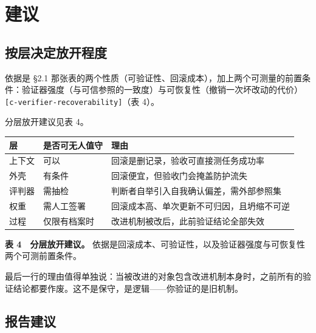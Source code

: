 \section{建议}

\subsection{按层决定放开程度}

依据是 §2.1 那张表的两个性质（可验证性、回滚成本），加上两个可测量的前置条件：验证器强度（与可信参照的一致度）与可恢复性（撤销一次坏改动的代价）{\scriptsize\texttt{[c-\hspace{0pt}verifier-\hspace{0pt}recoverability]}}（表 4）。


分层放开建议见表 4。


\begin{table}[t]
\centering
\footnotesize
\setlength{\tabcolsep}{4pt}
\label{tab:4}
\begin{tabular}{lll}
\toprule
层 & 是否可无人值守 & 理由 \\
\midrule
上下文 & 可以 & 回滚是删记录，验收可直接测任务成功率 \\
外壳 & 有条件 & 回滚便宜，但验收门会掩盖防护流失 \\
评判器 & 需抽检 & 判断者自举引入自我确认偏差，需外部参照集 \\
权重 & 需人工签署 & 回滚成本高、单次更新不可归因，且坍缩不可逆 \\
过程 & 仅限有档案时 & 改进机制被改后，此前验证结论全部失效 \\
\bottomrule
\end{tabular}
\end{table}

\textbf{表 4　分层放开建议。} 依据是回滚成本、可验证性，以及验证器强度与可恢复性两个可测前置条件。


最后一行的理由值得单独说：当被改进的对象包含改进机制本身时，之前所有的验证结论都要作废。这不是保守，是逻辑——你验证的是旧机制。


\subsection{报告建议}

